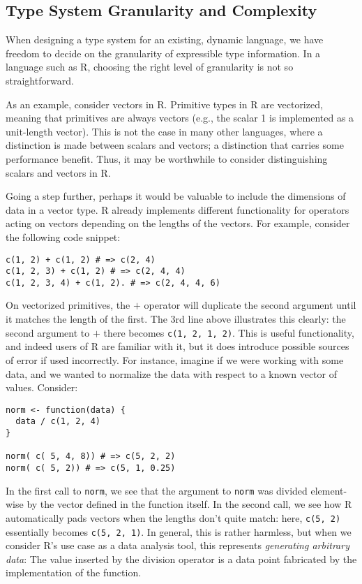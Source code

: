 \documentclass[sigplan,10pt,review]{acmart}\settopmatter{printfolios=true,printccs=false,printacmref=false}
\begin{document}
%
%
\subsection{Type System Granularity and Complexity}

When designing a type system for an existing, dynamic language, we have freedom to decide on the granularity of expressible type information.
In a language such as R, choosing the right level of granularity is not so straightforward.

As an example, consider vectors in R.
Primitive types in R are vectorized, meaning that primitives are always vectors (e.g., the scalar 1 is implemented as a unit-length vector).
This is not the case in many other languages, where a distinction is made between scalars and vectors; a distinction that carries some performance benefit.
Thus, it may be worthwhile to consider distinguishing scalars and vectors in R.

Going a step further, perhaps it would be valuable to include the dimensions of data in a vector type.
R already implements different functionality for operators acting on vectors depending on the lengths of the vectors.
For example, consider the following code snippet:

\begin{lstlisting}
c(1, 2) + c(1, 2) # => c(2, 4)
c(1, 2, 3) + c(1, 2) # => c(2, 4, 4)
c(1, 2, 3, 4) + c(1, 2). # => c(2, 4, 4, 6)
\end{lstlisting}

On vectorized primitives, the $+$ operator will duplicate the second argument until it matches the length of the first.
The 3rd line above illustrates this clearly: the second argument to $+$ there becomes {\tt c(1, 2, 1, 2)}.
This is useful functionality, and indeed users of R are familiar with it, but it does introduce possible sources of error if used incorrectly.
For instance, imagine if we were working with some data, and we wanted to normalize the data with respect to a known vector of values.
Consider:

\begin{lstlisting}
norm <- function(data) {
  data / c(1, 2, 4)
}

norm( c( 5, 4, 8)) # => c(5, 2, 2)
norm( c( 5, 2)) # => c(5, 1, 0.25)
\end{lstlisting}

In the first call to {\tt norm}, we see that the argument to {\tt norm} was divided element-wise by the vector defined in the function itself.
In the second call, we see how R automatically pads vectors when the lengths don't quite match: here, {\tt c(5, 2)} essentially becomes {\tt c(5, 2, 1)}.
In general, this is rather harmless, but when we consider R's use case as a data analysis tool, this represents {\it generating arbitrary data}: 
The value inserted by the division operator is a data point fabricated by the implementation of the function.
\end{document}
